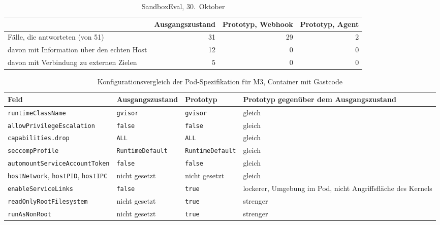 \begin{table}[H]
  \caption{SandboxEval, 30.\ Oktober}
  \label{tab:sandboxeval}
  \small
  \begin{tabularx}{\textwidth}{@{}>{\RaggedRight\arraybackslash}X r r r@{}}
    \hline
     & Ausgangszustand & Prototyp, Webhook & Prototyp, Agent \\
    \hline
    Fälle, die antworteten (von 51) & 31 & 29 & 2 \\
    davon mit Information über den echten Host & 12 & 0 & 0 \\
    davon mit Verbindung zu externen Zielen & 5 & 0 & 0 \\
    \hline
  \end{tabularx}
\end{table}

\begin{table}[H]
  \caption{Konfigurationsvergleich der Pod-Spezifikation für M3, Container mit Gastcode}
  \label{tab:m3}
  \footnotesize
  \begin{tabularx}{\textwidth}{@{}l l l >{\RaggedRight\arraybackslash}X@{}}
    \hline
    Feld & Ausgangszustand & Prototyp & Prototyp gegenüber dem Ausgangszustand \\
    \hline
    \texttt{runtimeClassName} & \texttt{gvisor} & \texttt{gvisor} & gleich \\
    \texttt{allowPrivilegeEscalation} & \texttt{false} & \texttt{false} & gleich \\
    \texttt{capabilities.drop} & \texttt{ALL} & \texttt{ALL} & gleich \\
    \texttt{seccompProfile} & \texttt{RuntimeDefault} & \texttt{RuntimeDefault} & gleich \\
    \texttt{automountServiceAccountToken} & \texttt{false} & \texttt{false} & gleich \\
    \texttt{hostNetwork}, \texttt{hostPID}, \texttt{hostIPC} & nicht gesetzt & nicht gesetzt & gleich \\
    \texttt{enableServiceLinks} & \texttt{false} & \texttt{true} & lockerer, Umgebung im Pod, nicht Angriffsfläche des Kernels \\
    \texttt{readOnlyRootFilesystem} & nicht gesetzt & \texttt{true} & strenger \\
    \texttt{runAsNonRoot} & nicht gesetzt & \texttt{true} & strenger \\
    \hline
  \end{tabularx}
\end{table}

